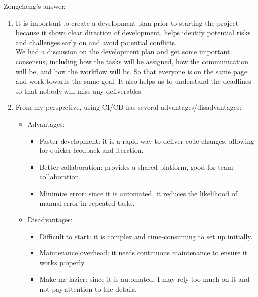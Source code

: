 \documentclass{article}
\begin{document}
Zongcheng's answer: \\
\begin{enumerate}
  \item It is important to create a development plan prior to starting the project because it shows clear direction of development, 
helps identify potential risks and challenges early on and avoid potential conflicts. \\
We had a discussion on the development plan and 
get some important consensus, including how the tasks will be assigned, how the communication will be, and how the workflow will be.
So that everyone is on the same page and work towards the same goal. It also helps us to understand the deadlines so that nobody will 
miss any deliverables.
  \item From my perspective, using CI/CD has several advantages/disadvantages:
  \begin{itemize}
    \item Advantages:
      \begin{itemize}
        \item Faster development: it is a rapid way to deliver code changes, allowing for quicker feedback and iteration.
        \item Better collaboration: provides a shared platform, good for team collaboration.
        \item Minimize error: since it is automated, it reduces the likelihood of manual error in repeated tasks.
      \end{itemize}
    \item Disadvantages:
      \begin{itemize}
        \item Difficult to start: it is complex and time-consuming to set up initially.
        \item Maintenance overhead: it needs continuous maintenance to ensure it works properly.
        \item Make me  lazier: since it is automated, I may rely too much on it and not pay attention to the details.
      \end{itemize}
  \end{itemize}
\end{enumerate}
\end{document}
